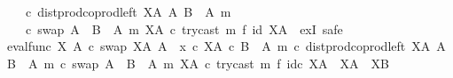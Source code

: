 \begin{isabellebody}
\ \ \ \ {\isasymcirc}\isactrlsub c\ dist{\isacharunderscore}{\kern0pt}prod{\isacharunderscore}{\kern0pt}coprod{\isacharunderscore}{\kern0pt}left\ {\isacharparenleft}{\kern0pt}X\isactrlbsup A\isactrlesup {\isacharparenright}{\kern0pt}\ A\ {\isacharparenleft}{\kern0pt}B\ {\isasymsetminus}\ {\isacharparenleft}{\kern0pt}A{\isacharcomma}{\kern0pt}\ m{\isacharparenright}{\kern0pt}{\isacharparenright}{\kern0pt}\ \isanewline
\ \ \ \ {\isasymcirc}\isactrlsub c\ swap\ {\isacharparenleft}{\kern0pt}A\ {\isasymCoprod}\ {\isacharparenleft}{\kern0pt}B\ {\isasymsetminus}\ {\isacharparenleft}{\kern0pt}A{\isacharcomma}{\kern0pt}\ m{\isacharparenright}{\kern0pt}{\isacharparenright}{\kern0pt}{\isacharparenright}{\kern0pt}\ {\isacharparenleft}{\kern0pt}X\isactrlbsup A\isactrlesup {\isacharparenright}{\kern0pt}\ {\isasymcirc}\isactrlsub c\ {\isacharparenleft}{\kern0pt}try{\isacharunderscore}{\kern0pt}cast\ m\ {\isasymtimes}\isactrlsub f\ id\ {\isacharparenleft}{\kern0pt}X\isactrlbsup A\isactrlesup {\isacharparenright}{\kern0pt}{\isacharparenright}{\kern0pt}{\isacharparenright}{\kern0pt}\isactrlsup {\isasymsharp}{\isachardoublequoteclose}\ \ exI{\isacharcomma}{\kern0pt}\ safe{\isacharparenright}{\kern0pt}\isanewline
\isanewline
\ \ \ \ \isamarkupfalse%
\ {\isachardoublequoteopen}{\isacharparenleft}{\kern0pt}{\isacharparenleft}{\kern0pt}eval{\isacharunderscore}{\kern0pt}func\ X\ A\ {\isasymcirc}\isactrlsub c\ swap\ {\isacharparenleft}{\kern0pt}X\isactrlbsup A\isactrlesup {\isacharparenright}{\kern0pt}\ A{\isacharparenright}{\kern0pt}\ {\isasymamalg}\ {\isacharparenleft}{\kern0pt}x\ {\isasymcirc}\isactrlsub c\ {\isasymbeta}\isactrlbsub X\isactrlbsup A\isactrlesup \ {\isasymtimes}\isactrlsub c\ {\isacharparenleft}{\kern0pt}B\ {\isasymsetminus}\ {\isacharparenleft}{\kern0pt}A{\isacharcomma}{\kern0pt}\ m{\isacharparenright}{\kern0pt}{\isacharparenright}{\kern0pt}\isactrlesub {\isacharparenright}{\kern0pt}\ {\isasymcirc}\isactrlsub c\ dist{\isacharunderscore}{\kern0pt}prod{\isacharunderscore}{\kern0pt}coprod{\isacharunderscore}{\kern0pt}left\ {\isacharparenleft}{\kern0pt}X\isactrlbsup A\isactrlesup {\isacharparenright}{\kern0pt}\ A\ {\isacharparenleft}{\kern0pt}B\ {\isasymsetminus}\ {\isacharparenleft}{\kern0pt}A{\isacharcomma}{\kern0pt}\ m{\isacharparenright}{\kern0pt}{\isacharparenright}{\kern0pt}\ {\isasymcirc}\isactrlsub c\ swap\ {\isacharparenleft}{\kern0pt}A\ {\isasymCoprod}\ {\isacharparenleft}{\kern0pt}B\ {\isasymsetminus}\ {\isacharparenleft}{\kern0pt}A{\isacharcomma}{\kern0pt}\ m{\isacharparenright}{\kern0pt}{\isacharparenright}{\kern0pt}{\isacharparenright}{\kern0pt}\ {\isacharparenleft}{\kern0pt}X\isactrlbsup A\isactrlesup {\isacharparenright}{\kern0pt}\ {\isasymcirc}\isactrlsub c\ try{\isacharunderscore}{\kern0pt}cast\ m\ {\isasymtimes}\isactrlsub f\ id\isactrlsub c\ {\isacharparenleft}{\kern0pt}X\isactrlbsup A\isactrlesup {\isacharparenright}{\kern0pt}{\isacharparenright}{\kern0pt}\isactrlsup {\isasymsharp}\ {\isacharcolon}{\kern0pt}\ X\isactrlbsup A\isactrlesup \ {\isasymrightarrow}\ X\isactrlbsup B\isactrlesup {\isachardoublequoteclose}\isanewline

\end{isabellebody}
